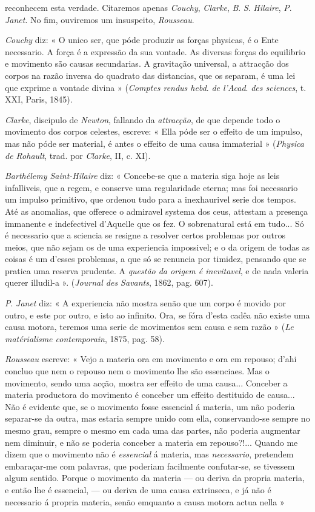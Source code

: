 reconhecem esta verdade. Citaremos apenas \emph{Couchy}, \emph{Clarke}, \emph{B}. \emph{S}. \emph{Hilaire}, \emph{P}. \emph{Janet}. No fim, ouviremos um insuspeito, \emph{Rousseau}.\par \emph{Couchy} diz: « O unico ser, que póde produzir as forças physicas, é o Ente necessario. A força é a expressão da sua vontade. As diversas forças do equilibrio e movimento são causas secundarias. A gravitação universal, a attracção dos corpos na razão inversa do quadrato das distancias, que os separam, é uma lei que exprime a vontade divina » (\emph{Comptes rendus hebd}. \emph{de l'Acad}. \emph{des sciences}, t. XXI, Paris, 1845).\par \emph{Clarke}, discipulo de \emph{Newton}, fallando da \emph{attracção}, de que depende todo o movimento dos corpos celestes, escreve: « Ella póde ser o effeito de um impulso, mas não póde ser material, é antes o effeito de uma causa immaterial » (\emph{Physica de Rohault}, trad. por \emph{Clarke}, II, c. XI).\par \emph{Barthélemy Saint-Hilaire} diz: « Concebe-se que a materia siga hoje as leis infalliveis, que a regem, e conserve uma regularidade eterna; mas foi necessario um impulso primitivo, que ordenou tudo para a inexhaurivel serie dos tempos. Até as anomalias, que offerece o admiravel systema dos ceus, attestam a presença immanente e indefectivel d'Aquelle que os fez. O sobrenatural está em tudo... Só é necessario que a sciencia se resigne a resolver certos problemas por outros meios, que não sejam os de uma experiencia impossivel; e o da origem de todas as coisas é um d'esses problemas, a que só se renuncia por timidez, pensando que se pratica uma reserva prudente. A \emph{questão da origem é inevitavel}, e de nada valeria querer illudil-a ». (\emph{Journal des Savants}, 1862, pag. 607).\par \emph{P}. \emph{Janet} diz: « A experiencia não mostra senão que um corpo é movido por outro, e este por outro, e isto ao infinito. Ora, se fóra d'esta cadêa não existe uma causa motora, teremos uma serie de movimentos sem causa e sem razão » (\emph{Le matérialisme contemporain}, 1875, pag. 58).\par \emph{Rousseau} escreve: « Vejo a materia ora em movimento e ora em repouso; d'ahi concluo que nem o repouso nem o movimento lhe são essenciaes. Mas o movimento, sendo uma acção, mostra ser effeito de uma causa... Conceber a materia productora do movimento é conceber um effeito destituido de causa... Não é evidente que, se o movimento fosse essencial á materia, um não poderia separar-se da outra, mas estaria sempre unido com ella, conservando-se sempre no mesmo grau, sempre o mesmo em cada uma das partes, não poderia augmentar nem diminuir, e não se poderia conceber a materia em repouso?!... Quando me dizem que o movimento não é \emph{essencial} á materia, mas \emph{necessario}, pretendem embaraçar-me com palavras, que poderiam facilmente confutar-se, se tivessem algum sentido. Porque o movimento da materia --- ou deriva da propria materia, e então lhe é essencial, --- ou deriva de uma causa extrinseca, e já não é necessario á propria materia, senão emquanto a causa motora actua nella » 